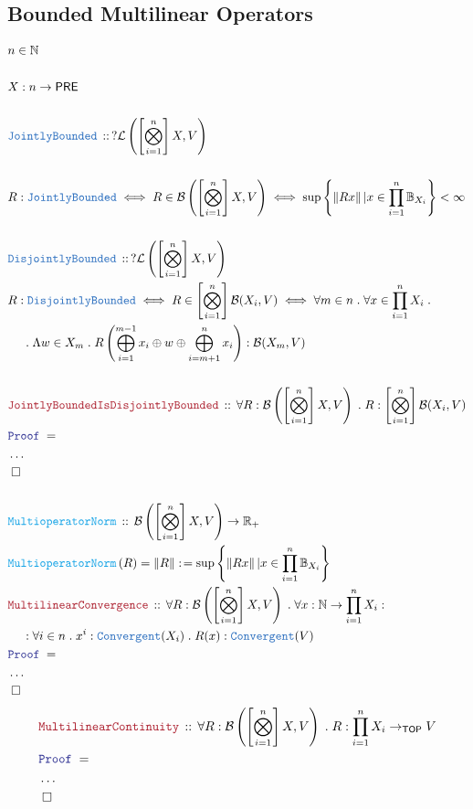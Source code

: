 \documentclass[12pt]{scrartcl}
\newcommand{\TYPE}[1]{\textcolor{NavyBlue}{\mathtt{#1}}}
\newcommand{\FUNC}[1]{\textcolor{Cerulean}{\mathtt{#1}}}
\newcommand{\LOGIC}[1]{\textcolor{Blue}{\mathtt{#1}}}
\newcommand{\THM}[1]{\textcolor{Maroon}{\mathtt{#1}}}
\renewcommand{\.}{\; . \;}
\newcommand{\de}{: \kern 0.1pc =}
\newcommand{\Act}[1]{\left( #1 \right)}
\newcommand{\Theorem}[2]{& \THM{#1} \, :: \, #2 \\ & \Proof = \\ }
\newcommand{\DeclareType}[2]{& \TYPE{#1} \, :: \, #2 \\}
\newcommand{\DefineNamedType}[4]{& #1 : \TYPE{#2} \iff #3 \iff #4 \\}
\newcommand{\DeclareFunc}[2]{& \FUNC{#1} \, :: \, #2 \\}
\newcommand{\DefineNamedFunc}[4]{&  \FUNC{#1}\Act{#2} = #3 \de #4 \\}
\newcommand{\NewLine}{\\ & \kern 1pc}
\newcommand{\Page}[1]{\begin{align*} #1 \end{align*} \newpage   }
\newcommand{\NoProof}{ & \ldots \\ \EndProof}
\newcommand{\Reals}{\mathbb{R} }
\newcommand{\Nat}{\mathbb{N} }
\newcommand{\QED}{\; \square}
\newcommand{\EndProof}{& \QED \\}
\newcommand{\Proof}{\LOGIC{Proof} \; }
\newcommand{\Ball}{ \mathbb{B} }
\newcommand{\PRE}{\mathsf{PRE}} %
\newcommand{\B}{\mathcal{B}}
\begin{document}
 \subsection{Bounded Multilinear Operators}
 \Page
 {
   & n \in \Nat \\
    \\
   &   X : n \to \PRE  \\
    \\
    \DeclareType{ JointlyBounded }{ ? \mathcal{L}\left( \left[ \bigotimes^n_{i = 1 } \right] X , V \right)} \\
    \DefineNamedType{R}{ JointlyBounded }{ R \in \B\left( \left[\bigotimes^n_{i = 1 } \right] X , V  \right)}
      { \sup \left\{ \left\| R x  \right\| | x \in  
       \prod^n_{i=1} \Ball_{X_i}      
      \right\} < \infty}
  \\
  \DeclareType{DisjointlyBounded }{ ? \mathcal{L}\left( \left[ \bigotimes^n_{i = 1 } \right] X , V \right) }   
  \DefineNamedType{R}{ DisjointlyBounded }{ R \in \left[ \bigotimes^n_{i = 1 } \right]\mathcal{B}(X_i,V) }
  { \forall m \in n \. \forall x \in \prod^n_{i = 1} X_i  \. 
   \NewLine \.
  \Lambda w \in X_m \. 
     R \left( \bigoplus^{m-1}_{i = 1} x_i \oplus w \oplus \bigoplus^{n}_{i = m + 1} x_i \right)
      : \B(X_m,V)     
       }
      \\
 \Theorem{JointlyBoundedIsDisjointlyBounded}{ \forall R : \B\left( \left[\bigotimes^n_{i = 1 } \right] X , V  \right) \.  R : \left[ \bigotimes^n_{i = 1 } \right]\mathcal{B}(X_i,V) }
\NoProof
\\
\DeclareFunc{MultioperatorNorm}{ \B\left( \left[\bigotimes^n_{i = 1 } \right] X , V  \right)
 \to \Reals_+
 }
\DefineNamedFunc{ MultioperatorNorm }{ R }{ \| R \| }{ \sup \left\{ \left\| R x  \right\| | x \in  
       \prod^n_{i=1} \Ball_{X_i}      
      \right\}  }
\Theorem{MultilinearConvergence}{ \forall R : \B\left( \left[\bigotimes^n_{i = 1 } \right] X , V  \right) \. \forall x : \Nat \to \prod^n_{i = 1} X_i :
 \NewLine :
 \forall i \in n \. x^i : \TYPE{Convergent}( X_i ) \.  R(x) : \TYPE{Convergent}(V) } 
 \NoProof  
 }
 \Page{                
\Theorem{MultilinearContinuity}{ \forall R : \B\left( \left[\bigotimes^n_{i = 1 } \right] X , V  \right) \.  R : \prod^n_{i = 1} X_i \to_{\mathsf{TOP}} V }
\NoProof                    
      }
\end{document}
